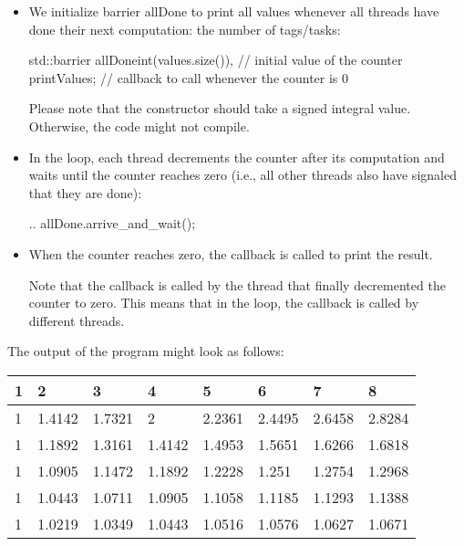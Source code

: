 \begin{itemize}
\item 
We initialize barrier allDone to print all values whenever all threads have done their next computation: the number of tags/tasks:

\begin{cpp}
std::barrier allDone{int(values.size()), // initial value of the counter
					 printValues}; // callback to call whenever the counter is 0
\end{cpp}

Please note that the constructor should take a signed integral value. Otherwise, the code might not compile.

\item 
In the loop, each thread decrements the counter after its computation and waits until the counter reaches zero (i.e., all other threads also have signaled that they are done):

\begin{cpp}
..
allDone.arrive_and_wait();
\end{cpp}

\item 
When the counter reaches zero, the callback is called to print the result.

Note that the callback is called by the thread that finally decremented the counter to zero. This means that in the loop, the callback is called by different threads.
\end{itemize}

The output of the program might look as follows:

\begin{longtable}[c]{llllllll}
1 & 2      & 3      & 4      & 5      & 6      & 7      & 8      \\
\endfirsthead
%
\endhead
%
1 & 1.4142 & 1.7321 & 2      & 2.2361 & 2.4495 & 2.6458 & 2.8284 \\
1 & 1.1892 & 1.3161 & 1.4142 & 1.4953 & 1.5651 & 1.6266 & 1.6818 \\
1 & 1.0905 & 1.1472 & 1.1892 & 1.2228 & 1.251  & 1.2754 & 1.2968 \\
1 & 1.0443 & 1.0711 & 1.0905 & 1.1058 & 1.1185 & 1.1293 & 1.1388 \\
1 & 1.0219 & 1.0349 & 1.0443 & 1.0516 & 1.0576 & 1.0627 & 1.0671
\end{longtable}

